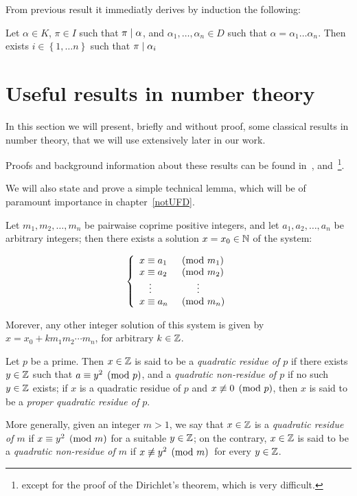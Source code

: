 From previous result it immediatly derives by
induction the following:

\begin{cor}\label{basic_property_of_K}
Let $\alpha \in K$, $\pi \in I$ such that
$\pi \mid \alpha$, and
\mbox{$\alpha_1, \ldots, \alpha_n \in D$} such that
$\alpha = \alpha_1 \ldots \alpha_n$. Then exists
$i \in \left\{ 1, \ldots n\right\}$ such that
$\pi \mid \alpha_i$
\end{cor}

\section{Useful results in number theory}\label{number_theory}

In this section we will present, briefly and without proof, some
classical results in number theory, that we will use extensively
later in our work.

Proofs and background information about these results can be found
in~\cite{H&W}, \cite{Childs} and~\cite{Dav}\footnote{%
except for the proof of the Dirichlet's theorem, which is very
difficult.}.

We will also state and prove a simple technical lemma, which will be
of paramount importance in chapter~\ref{notUFD}.

\begin{thmen}
Let $m_1, m_2, \ldots, m_n$ be pairwaise coprime positive integers, and
let $a_1, a_2, \ldots, a_n$ be arbitrary integers; then there exists a
solution $x = x_0\in\mathbb{N}$ of the system:

\begin{equation*}
%
\left\{
\begin{array}{ll}
x \congruent a_1 & \pmod{m_1} \\
x \congruent a_2 & \pmod{m_2} \\
\quad \vdots & \quad\quad \vdots \\
x \congruent a_n & \pmod{m_n} \\
\end{array}
\right.
\end{equation*}

Morever, any other integer solution of this system is given by\/
$x = x_0 + k m_1 m_2 \cdots m_n$, for arbitrary $k\in\mathbb{Z}$.
\end{thmen}

\begin{defnen}
Let $p$ be a prime. Then $x \in \mathbb{Z}$ is said to be a\/
\emph{quadratic residue of $p$\/} if there exists\/ $y\in\mathbb{Z}$\/ such
that\/ $a \equiv y^2 \pmod p$, and a\/ \emph{quadratic non-residue
of $p$\/} if no such $y\in\mathbb{Z}$ exists; if $x$ is a quadratic residue of
$p$ and\/ $x \not\equiv 0 \pmod p$, then\/ $x$\/ is said to be a\/
\emph{proper quadratic residue of $p$\/}.

More generally, given an integer $m > 1$, we say that $x\in\mathbb{Z}$ is
a\/ \emph{quadratic residue of $m$\/} if\/ $x \equiv y^2 \pmod m$\/
for a suitable $y\in\mathbb{Z}$; on the contrary, $x\in\mathbb{Z}$ is said to be a\/
\emph{quadratic non-residue of $m$\/} if\/ $x \not\equiv y^2 \pmod m$\,
for every\/ $y\in\mathbb{Z}$.
\end{defnen}

